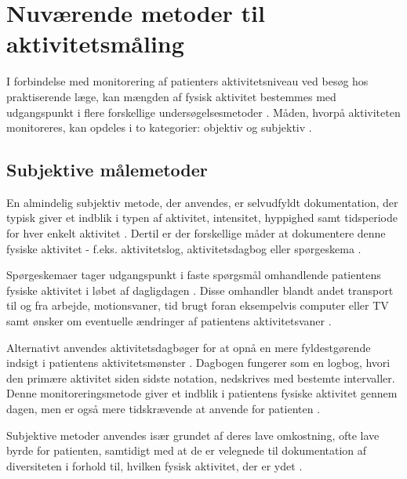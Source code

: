 \section{Nuværende metoder til aktivitetsmåling}

I forbindelse med monitorering af patienters aktivitetsniveau ved besøg hos praktiserende læge, kan mængden af fysisk aktivitet bestemmes med udgangspunkt i flere forskellige undersøgelsesmetoder \citep{motionsraad2007}. 
Måden, hvorpå aktiviteten monitoreres, kan opdeles i to kategorier: objektiv og subjektiv \citep{motionsraad2007, adamo2009}. 
 
\subsection{Subjektive målemetoder}

En almindelig subjektiv metode, der anvendes, er selvudfyldt dokumentation, der typisk giver et indblik i typen af aktivitet, intensitet, hyppighed samt tidsperiode for hver enkelt aktivitet \citep{adamo2009}. Dertil er der forskellige måder at dokumentere denne fysiske aktivitet - f.eks. aktivitetslog, aktivitetsdagbog eller spørgeskema \citep{adamo2009}. 


Spørgeskemaer tager udgangspunkt i faste spørgsmål omhandlende patientens fysiske aktivitet i løbet af dagligdagen \citep{muller2009}. 
Disse omhandler blandt andet transport til og fra arbejde, motionsvaner, tid brugt foran eksempelvis computer eller TV samt ønsker om eventuelle ændringer af patientens aktivitetsvaner \citep{motionsraad2007, vestergaard2012}. 

Alternativt anvendes aktivitetsdagbøger for at opnå en mere fyldestgørende indsigt i patientens aktivitetsmønster \citep{motionsraad2007,muller2009}. 
Dagbogen fungerer som en logbog, hvori den primære aktivitet siden sidste notation, nedskrives med bestemte intervaller. 
Denne monitoreringsmetode giver et indblik i patientens fysiske aktivitet gennem dagen, men er også mere tidskrævende at anvende for patienten \citep{motionsraad2007}.


Subjektive metoder anvendes især grundet af deres lave omkostning, ofte lave byrde for patienten, samtidigt med at de er velegnede til dokumentation af diversiteten i forhold til, hvilken fysisk aktivitet, der er ydet \citep{adamo2009}.

